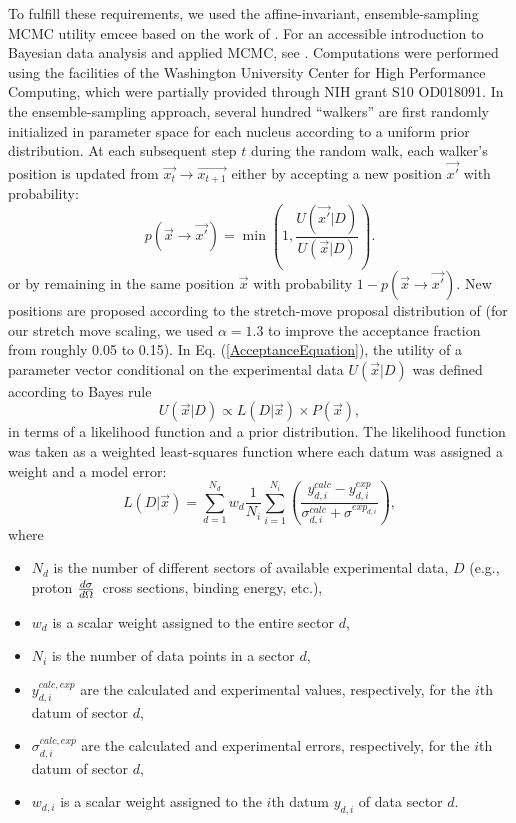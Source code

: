 \documentclass[twocolumn,secnumarabic,amssymb, nobibnotes, aps, prl,
superscriptaddress, nobalancelastpage]{revtex4}
\newcommand{\el}{\ensuremath{\frac{\lowercase{d}\sigma}{\lowercase{d}\Omega}}}
\begin{document}
To fulfill these requirements, we used the affine-invariant, ensemble-sampling
MCMC utility emcee \cite{Foreman-Mackey2013} based on the work of \cite{Goodman2010}. For an
accessible introduction to Bayesian data analysis and applied MCMC, see
\cite{Sharma2017}. Computations were performed using the facilities of the Washington University
Center for High Performance Computing, which were partially provided through NIH
grant S10 OD018091. In the ensemble-sampling approach, several hundred
``walkers'' are first randomly initialized in parameter space for each nucleus according to a
uniform prior distribution. At each subsequent step $t$ during the
random walk, each walker's position is updated from $\vec{x_{t}} \rightarrow
\vec{x_{t+1}}$ either by accepting a new position $\vec{x'}$ with probability:
\begin{equation}\label{AcceptanceEquation}
    p(\vec{x}\rightarrow \vec{x'}) = \min(1,\frac{U(\vec{x'}|D)}{U(\vec{x}|D)}).
\end{equation}
or by remaining in the same position $\vec{x}$ with probability
$1-p(\vec{x}\rightarrow \vec{x'})$. New positions are proposed according
to the stretch-move proposal distribution of \cite{Goodman2010} (for our stretch
move scaling, we used $\alpha = 1.3$ to improve the acceptance fraction from
roughly 0.05 to 0.15). In Eq.
(\ref{AcceptanceEquation}), the utility of a parameter vector conditional on the
experimental data $U(\vec{x}|D)$ was defined according to Bayes rule
\begin{equation}
    U(\vec{x}|D) \propto L(D|\vec{x}) \times P(\vec{x}),
\end{equation}
in terms of a likelihood function and a prior distribution. The likelihood
function was taken as a weighted least-squares function where each datum was assigned
a weight and a model error:
\begin{equation} \label{LikelihoodFunction}
    L(D|\vec{x}) = \sum_{d=1}^{N_{d}} w_{d} \frac{1}{N_{i}} \sum_{i=1}^{N_{i}}
    \left(\frac{y^{calc}_{d,i}-y^{exp}_{d,i}}{\sigma^{calc}_{d,i}+\sigma^{exp_{d,i}}}\right),
\end{equation}
where
\begin{itemize}
    \item $N_{d}$ is the number of different sectors of available experimental
        data, $D$ (e.g., proton \el\ cross sections,
binding energy, etc.),
    \item $w_{d}$ is a scalar weight assigned to the entire sector $d$,
    \item $N_{i}$ is the number of data points in a sector $d$,
    \item $y^{calc, exp}_{d,i}$ are the calculated and experimental values,
        respectively, for the $i$th datum of sector $d$,
    \item $\sigma^{calc, exp}_{d,i}$ are the calculated and experimental errors,
        respectively, for the $i$th datum of sector $d$,
    \item $w_{d,i}$ is a scalar weight assigned to the $i$th datum
        $y_{d,i}$ of data sector $d$.
\end{itemize}
\end{document}
